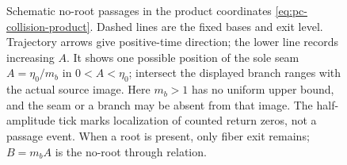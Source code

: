 \begin{figure}[H]
\caption{Schematic no-root passages in the product coordinates
\eqref{eq:pc-collision-product}. Dashed lines are the fixed bases and exit
level. Trajectory arrows give positive-time direction; the lower line records
increasing $A$. It shows one possible position of the sole seam
$A=\eta_0/m_b$ in $0<A<\eta_0$;
intersect the displayed branch ranges with the actual source image.
Here $m_b>1$ has no uniform upper bound, and the seam or a branch may be
absent from that image. The half-amplitude tick marks localization of
counted return zeros, not a passage event. When a root is present, only
fiber exit remains; $B=m_bA$ is the no-root through relation.}
\label{fig:collision-passages}
\end{figure}
